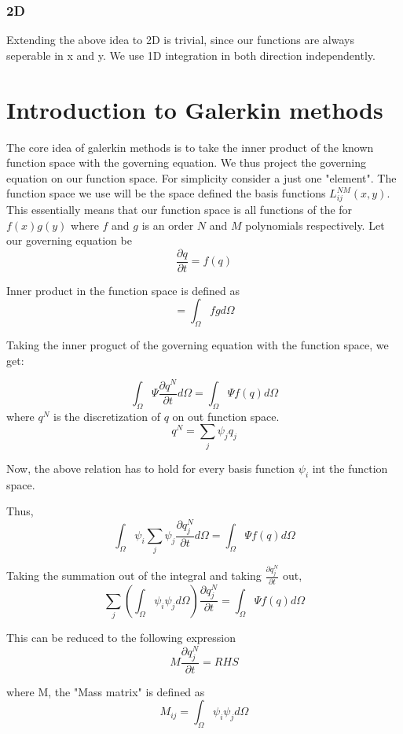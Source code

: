\documentclass[11pt]{article}
\begin{document}
\subsubsection{2D}\label{d-1}

Extending the above idea to 2D is trivial, since our functions are
always seperable in x and y. We use 1D integration in both direction
independently.

    \section{Introduction to Galerkin
methods}\label{introduction-to-galerkin-methods}

The core idea of galerkin methods is to take the inner product of the
known function space with the governing equation. We thus project the
governing equation on our function space. For simplicity consider a just
one "element". The function space we use will be the space defined the
basis functions \(L^{NM}_{ij}(x,y)\). This essentially means that our
function space is all functions of the for \(f(x)g(y)\) where \(f\) and
\(g\) is an order \(N\) and \(M\) polynomials respectively. Let our
governing equation be \[\frac{\partial q}{\partial t} = f(q)\]

Inner product in the function space is defined as
\[<f,g> = \int_{\Omega} fg d\Omega\]

Taking the inner proguct of the governing equation with the function
space, we get:

\[\int_{\Omega}\Psi \frac{\partial q^N}{\partial t}d\Omega = \int_{\Omega}\Psi f(q) d\Omega\]
where \(q^N\) is the discretization of \(q\) on out function space.
\[q^N = \sum_j \psi_j q_j\]

Now, the above relation has to hold for every basis function \(\psi_i\)
int the function space.

Thus,
\[\int_{\Omega}\psi_i \sum_j \psi_j \frac{\partial q_j^N}{\partial t}d\Omega = \int_{\Omega}\Psi f(q) d\Omega\]

Taking the summation out of the integral and taking
\(\frac{\partial q_j^N}{\partial t}\) out,
\[ \sum_j (\int_{\Omega}\psi_i \psi_j d\Omega) \frac{\partial q_j^N}{\partial t} = \int_{\Omega}\Psi f(q) d\Omega\]

This can be reduced to the following expression
\[M \frac{\partial q_j^N}{\partial t} = RHS\]

where M, the "Mass matrix" is defined as
\[M_{ij} = \int_{\Omega}\psi_i \psi_j d\Omega\]
\end{document}
